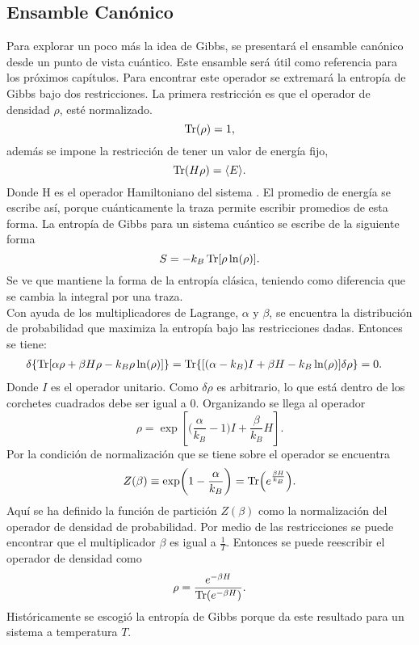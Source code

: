 \subsection{Ensamble Canónico}
Para explorar un poco más la idea de Gibbs, se presentará el ensamble canónico desde un punto de vista cuántico. Este ensamble será útil como referencia para los próximos capítulos. Para encontrar este operador se extremará la entropía de Gibbs bajo dos restricciones. La primera restricción es que el operador de densidad $\rho$, esté normalizado.
\begin{equation}
\Tr(\rho)=1,
\end{equation}
además se impone la restricción de tener un valor de energía fijo,
\begin{equation}
\Tr(H \rho)= \langle E \rangle.
\end{equation}
Donde H  es el operador Hamiltoniano del sistema  \cite{ReichlStat}. El promedio de energía se escribe así, porque cuánticamente la traza permite escribir promedios de esta forma. La entropía de Gibbs para un sistema cuántico se escribe de la siguiente forma
\begin{equation}
S=-k_{B} \Tr[\rho \ln (\rho)].
\end{equation}
Se ve que mantiene la forma de la entropía clásica, teniendo como diferencia que se cambia la integral por una traza. \\
Con ayuda de los multiplicadores de Lagrange, $\alpha$ y $\beta$, se encuentra la distribución de probabilidad que maximiza la entropía bajo las restricciones dadas. Entonces se tiene:
\begin{align}
\delta \{ \Tr [ \alpha \rho + \beta H \rho - k_{B} \rho \ln (\rho)] \} 
&= \Tr \{ [(\alpha - k_{B})I + \beta H - k_{B} \ln (\rho) ] \delta \rho \}=0.
\end{align}
Donde $I$ es el operador unitario. Como $\delta \rho$ es arbitrario, lo que está dentro de los corchetes cuadrados debe ser igual a 0. Organizando se llega al operador
\begin{equation}
\rho= \exp [ \bigg( \frac{ \alpha }{k_{B}}-1 \bigg) I + \frac{\beta}{k_{B}}H ].
\end{equation}
Por la condición de normalización que se tiene sobre el operador se encuentra
\begin{equation}
Z(\beta) \equiv \exp (1- \frac{ \alpha }{k_{B}}) = \Tr (e^{\frac{\beta H}{k_{B}}}).
\end{equation}
Aquí se ha definido la función de partición $Z(\beta)$ como la normalización del operador de densidad de probabilidad. Por medio de las restricciones se puede encontrar que el multiplicador $\beta$ es igual a $\frac{1}{T}$. Entonces se puede reescribir el operador de densidad  como
\begin{equation}
\rho = \frac{ e^{-\beta H}}{\Tr( e^{-\beta H})}.
\end{equation}
Históricamente se escogió la entropía de Gibbs porque da este resultado para un sistema a temperatura $T$.
\\
